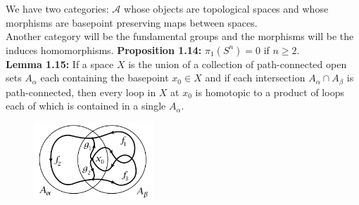 \documentclass[a4paper]{article}
\begin{document}
 We have two categories: $\mathcal{A}$ whose objects are topological spaces and
 whose morphisms are basepoint preserving
 maps between spaces.\\
 Another category will be the fundamental groups and the morphisms will be the
 induces homomorphisms.
 \textbf{Proposition 1.14:} $\pi_1 \left( S^{n} \right) = 0 $ if $n\ge 2$.\\
 \linebreak
 \textbf{Lemma 1.15:} If a space $X$ is the union of a collection of
 path-connected open sets $A_{\alpha}$ each containing the basepoint $x_0 \in
 X$ and
 if each intersection $A_{\alpha} \cap A_{\beta}$ is path-connected, then every
 loop in $X$ at $x_0$ is homotopic to a product of loops each of which is
 contained in a single $A_{\alpha}$.
 \begin{figure}[htpb]
     \centering
     \includegraphics[width=0.4\textwidth]{lemma115.png}
     \label{fig:lemma115-png}
 \end{figure}
\end{document}
